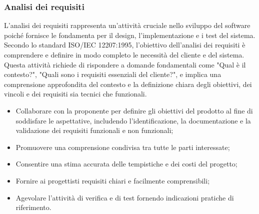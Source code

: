 \subsubsection{Analisi dei requisiti}

L'analisi dei requisiti rappresenta un'attività cruciale nello sviluppo del software poiché fornisce le fondamenta per il design, l'implementazione e i test del sistema.
Secondo lo standard ISO/IEC 12207:1995, l'obiettivo dell'analisi dei requisiti è comprendere e definire in modo completo le necessità del cliente e del sistema.
Questa attività richiede di rispondere a domande fondamentali come "Qual è il contesto?", "Quali sono i requisiti essenziali del cliente?", e implica una comprensione approfondita del contesto e la definizione chiara degli obiettivi, dei vincoli e dei requisiti sia tecnici che funzionali.

\begin{itemize}
	\item Collaborare con la proponente per definire gli obiettivi del prodotto al fine di soddisfare le aspettative, includendo l'identificazione, la documentazione e la validazione dei requisiti funzionali e non funzionali;
	\item Promuovere una comprensione condivisa tra tutte le parti interessate;
	\item Consentire una stima accurata delle tempistiche e dei costi del progetto;
	\item Fornire ai progettisti requisiti chiari e facilmente comprensibili;
	\item Agevolare l'attività di verifica e di test fornendo indicazioni pratiche di riferimento.
\end{itemize}

